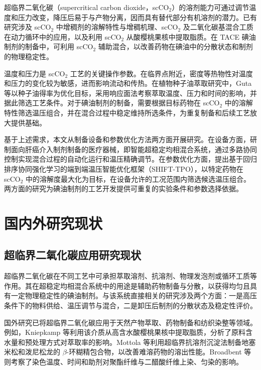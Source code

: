 超临界二氧化碳（supercritical carbon dioxide，scCO$_2$）的溶剂能力可通过调节温度和压力改变，降压后易于与产物分离，因而具有替代部分有机溶剂的潜力。已有研究涉及 scCO$_2$ 中增稠剂的溶解特性与增稠机理\supercite{Wang2024CO2Thickeners}、scCO$_2$ 及二氧化碳基混合工质在动力循环中的应用\supercite{Deng2025CO2PowerCycles}，以及利用 scCO$_2$ 从酸樱桃果核中提取脂质\supercite{Kniepkamp2024CherryStoneExtraction}。在 TACE 碘油制剂的制备中，可利用 scCO$_2$ 辅助混合，以改善药物在碘油中的分散状态和制剂的物理稳定性。

温度和压力是 scCO$_2$ 工艺的关键操作参数。在临界点附近，密度等热物性对温度和压力的变化较为敏感，进而影响流动和传热\supercite{Qing2025CarbonDioxideDensity,Zhang2024CO2HeatTransfer}。在植物种子油萃取研究中，Guta 等以种子油得率为优化目标，采用响应面法考察萃取温度、压力和时间的影响，并据此筛选工艺条件\supercite{Guta2025KorarimaExtraction}。对于碘油制剂的制备，需要根据目标药物在 scCO$_2$ 中的溶解特性筛选温压组合，并在混合过程中稳定维持所选条件，为重复制备和后续工艺放大提供基础。

基于上述需求，本文从制备设备和参数优化方法两方面开展研究。在设备方面，研制面向肝癌介入制剂制备的医疗器械，即智能超稳定均相混合系统，通过多路协同控制实现混合过程的自动化运行和温压精确调节。在参数优化方面，提出基于回归排序协同强化学习的端到端温压智能优化框架（SHIFT-TPO），以特定药物在 scCO$_2$ 中的溶解度最大化为目标，在设备允许的工况范围内筛选候选温压组合。两方面的研究为碘油制剂的工艺开发提供可重复的实验条件和参数选择依据。


\section{国内外研究现状}

\subsection{超临界二氧化碳应用研究现状}
\label{subsec:shift-research-progress}

超临界二氧化碳在不同工艺中可承担萃取溶剂、抗溶剂、物理发泡剂或循环工质等作用。其在超稳定均相混合系统中的用途是辅助药物制备与分散，以获得均匀且具有一定物理稳定性的碘油制剂。与该系统直接相关的研究涉及两个方面：一是高压条件下的物料供给、温压调节与混合，二是卸压后制剂的分散状态及稳定性评价。

国外研究已将超临界二氧化碳应用于天然产物萃取、药物制备和纺织染整等领域。例如，Kniepkamp 等利用该介质从高含水酸樱桃果核中提取脂质，分析了原料含水量和预处理方式对萃取率的影响\supercite{Kniepkamp2024CherryStoneExtraction}。Mottola 等利用超临界抗溶剂沉淀法制备地塞米松和泼尼松龙的 $\beta$-环糊精包合物，以改善难溶药物的溶出性能\supercite{Mottola2024CorticosteroidSAS}。Broadbent 等则考察了染色温度、时间和助剂对聚酯纤维与二醋酸纤维上染、匀染的影响\supercite{Broadbent2026SupercriticalDyeing}。

